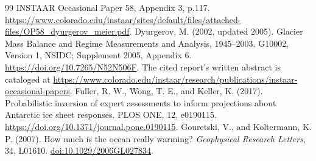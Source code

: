 \documentclass[11pt]{article}
\begin{document}
\begin{thebibliography}{99}
INSTAAR Occasional Paper 58, Appendix 3, p.117.
\url{https://www.colorado.edu/instaar/sites/default/files/attached-files/OP58_dyurgerov_meier.pdf}.
 Dyurgerov, M. (2002, updated 2005).
Glacier Mass Balance and Regime Measurements and Analysis, 1945--2003.
G10002, Version 1, NSIDC; Supplement 2005, Appendix 6.
\url{https://doi.org/10.7265/N52N506F}.
The cited report's written abstract is cataloged at
\url{https://www.colorado.edu/instaar/research/publications/instaar-occasional-papers}.
 Fuller, R. W., Wong, T. E., and Keller, K. (2017).
Probabilistic inversion of expert assessments to inform projections about
Antarctic ice sheet responses. PLOS ONE, 12, e0190115.
\url{https://doi.org/10.1371/journal.pone.0190115}.
 Gouretski, V., and Koltermann, K. P. (2007).
How much is the ocean really warming? \emph{Geophysical Research Letters},
34, L01610. \href{https://doi.org/10.1029/2006GL027834}{doi:10.1029/2006GL027834}.
\end{thebibliography}
\end{document}
